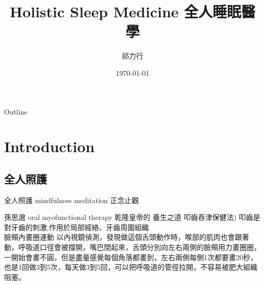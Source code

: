\documentclass[aspectratio=169]{beamer}
\title{Holistic Sleep Medicine 全人睡眠醫學}
\date[today]{\today}
\author[Name]{祁力行}
\institute[Oral and Maxillofacial Surgery]{Wan Fang Hospital, Taipei Medical University}
\begin{document}

\begin{frame}
\titlepage

\end{frame}



\begin{frame}{Outline}
\tableofcontents
\end{frame}


\section{Introduction}%
\subsection{全人照護}
\begin{frame}{全人照護}
mindfulness meditation
正念止觀

孫思邈 oral myofunctional therapy
乾隆皇帝的 養生之道 叩齒吞津保健法) 叩齒是對牙齒的刺激,作用於局部經絡、牙齒周圍組織\\

臉頰內畫圈運動%
以內視鏡偵測，發現做這個舌頭動作時，喉部的肌肉也會跟著動，呼吸道口徑會被撐開，嘴巴閉起來，舌頭分別向左右兩側的臉頰用力畫圈圈，一開始會畫不圓，但是盡量感覺每個角落都畫到，左右兩側每側1次都要畫20秒，也是1回做3到5次，每天做3到5回，可以把呼吸道的管徑拉開，不容易被肥大組織阻塞。

\end{frame}



\end{document}
